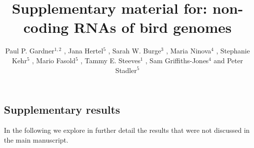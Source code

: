 \documentclass[10pt]{bmc_article}
\newenvironment{bmcformat}{\begin{raggedright}\baselineskip20pt\sloppy\setboolean{publ}{false}}{\end{raggedright}\baselineskip20pt\sloppy}
\begin{document}
\begin{bmcformat}

\title{Supplementary material for: non-coding RNAs of bird genomes}

\author{
Paul P. Gardner\correspondingauthor$^{1,2}$
,
Jana Hertel$^5$
,
Sarah W. Burge$^3$
,
Maria Ninova$^4$
,
Stephanie Kehr$^5$
,
Mario Fasold$^5$
,
Tammy E. Steeves$^1$
,
Sam Griffiths-Jones$^4$
and
Peter Stadler\correspondingauthor$^5$
}
\address{
\iid(1) School of Biological Sciences, University of Canterbury, Private Bag 4800, Christchurch, New Zealand.
\iid(2) Biomolecular Interaction Centre, University of Canterbury, Private Bag 4800, Christchurch, New Zealand.
\iid(3) European Molecular Biology Laboratory, European Bioinformatics Institute, Hinxton, Cambridge, CB10 1SD, UK.
\iid(4) Faculty of Life Sciences, University of Manchester, Manchester, United Kingdom.
\iid(5) Bioinformatics Group, Department of Computer Science; and Interdisciplinary Center for Bioinformatics, University of Leipzig, H{\"a}rtelstrasse 16-18, D-04107 Leipzig, Germany
}

\maketitle





\section*{Supplementary results}

In the following we explore in further detail the results that were
not discussed in the main manuscript. 


\end{bmcformat}
\end{document}
